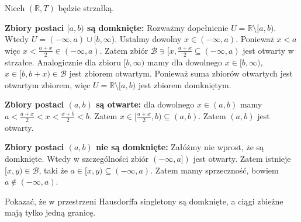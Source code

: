 \begin{solution}
\noindent Niech $\left( \mathbb{R},T \right) $ będzie strzałką.

\noindent  \textbf{Zbiory postaci $[a,b)$ są domknięte:} Rozważmy dopełnienie $U = \mathbb{R}\setminus [a,b)$. Wtedy $U = (-\infty,a) \cup [b, \infty)$. Ustalmy dowolny $x \in \left( -\infty, a \right) $. Ponieważ $x<a$ więc $x < \tfrac{a+x}{2} \in \left( -\infty,a \right) $. Zatem zbiór $\mathcal{B} \ni [x, \tfrac{a+x}{2} \subseteq \left( -\infty, a \right) $ jest otwarty w strzałce. Analogicznie dla zbioru $[b, \infty)$ mamy dla dowolnego $x \in [b,\infty)$, $x\in [b, b+x) \in \mathcal{B}$ jest zbiorem otwartym. Ponieważ suma zbiorów otwartych jest otwartym zbiorem, więc $U = \mathbb{R}\setminus [a,b)$ jest zbiorem domkniętym.

\noindent \textbf{Zbiory postaci $\left( a,b \right) $ są otwarte:} dla dowolnego $x \in \left( a,b \right) $ mamy $a < \tfrac{a+x}{2} < x < \tfrac{x+b}{2} < b$. Zatem $x \in [\frac{a+x}{2}, b) \subseteq \left( a,b \right) $. Zatem $\left( a,b \right) $ jest otwarty.

\noindent \textbf{Zbiory postaci $(a,b)$ nie są domknięte:}  Załóżmy nie wprost, że są domknięte. Wtedy w szczególności zbiór $\left( -\infty, a] \right) $ jest otwarty. Zatem istnieje $[x,y) \in \mathcal{B}$, taki że $a \in [x,y) \subseteq \left( -\infty,a \right) $. Zatem mamy sprzeczność, bowiem $a \not\in \left( -\infty, a \right) $.
\end{solution} 
\begin{problem}[3]
	Pokazać, że w przestrzeni Hausdorffa singletony są domknięte, a ciągi zbieżne mają tylko jedną granicę.
\end{problem} 
